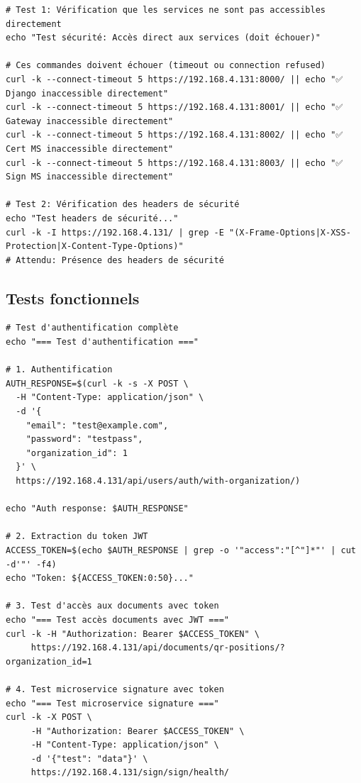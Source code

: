 \documentclass[12pt,a4paper]{article}
\begin{document}
\begin{lstlisting}[style=bash, caption={Tests de sécurité}]
# Test 1: Vérification que les services ne sont pas accessibles directement
echo "Test sécurité: Accès direct aux services (doit échouer)"

# Ces commandes doivent échouer (timeout ou connection refused)
curl -k --connect-timeout 5 https://192.168.4.131:8000/ || echo "✅ Django inaccessible directement"
curl -k --connect-timeout 5 https://192.168.4.131:8001/ || echo "✅ Gateway inaccessible directement"
curl -k --connect-timeout 5 https://192.168.4.131:8002/ || echo "✅ Cert MS inaccessible directement"
curl -k --connect-timeout 5 https://192.168.4.131:8003/ || echo "✅ Sign MS inaccessible directement"

# Test 2: Vérification des headers de sécurité
echo "Test headers de sécurité..."
curl -k -I https://192.168.4.131/ | grep -E "(X-Frame-Options|X-XSS-Protection|X-Content-Type-Options)"
# Attendu: Présence des headers de sécurité
\end{lstlisting}

\subsection{Tests fonctionnels}

\begin{lstlisting}[style=bash, caption={Tests fonctionnels complets}]
# Test d'authentification complète
echo "=== Test d'authentification ==="

# 1. Authentification
AUTH_RESPONSE=$(curl -k -s -X POST \
  -H "Content-Type: application/json" \
  -d '{
    "email": "test@example.com",
    "password": "testpass",
    "organization_id": 1
  }' \
  https://192.168.4.131/api/users/auth/with-organization/)

echo "Auth response: $AUTH_RESPONSE"

# 2. Extraction du token JWT
ACCESS_TOKEN=$(echo $AUTH_RESPONSE | grep -o '"access":"[^"]*"' | cut -d'"' -f4)
echo "Token: ${ACCESS_TOKEN:0:50}..."

# 3. Test d'accès aux documents avec token
echo "=== Test accès documents avec JWT ==="
curl -k -H "Authorization: Bearer $ACCESS_TOKEN" \
     https://192.168.4.131/api/documents/qr-positions/?organization_id=1

# 4. Test microservice signature avec token
echo "=== Test microservice signature ==="
curl -k -X POST \
     -H "Authorization: Bearer $ACCESS_TOKEN" \
     -H "Content-Type: application/json" \
     -d '{"test": "data"}' \
     https://192.168.4.131/sign/sign/health/
\end{lstlisting}
\end{document}
